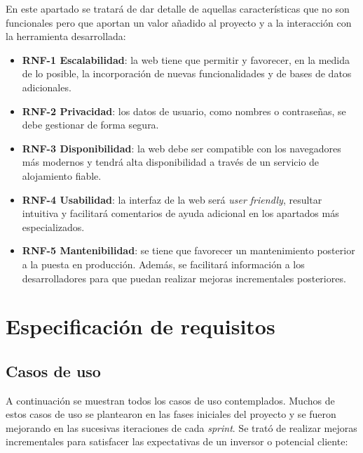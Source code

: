 En este apartado se tratará de dar detalle de aquellas características que no son funcionales pero que aportan un valor añadido al proyecto y a la interacción con la herramienta desarrollada:

\begin{itemize}
\item
\textbf{RNF-1 Escalabilidad}: la web tiene que permitir y favorecer, en la medida de lo posible, la incorporación de nuevas funcionalidades y de bases de datos adicionales. 

\item
\textbf{RNF-2 Privacidad}: los datos de usuario, como nombres o contraseñas, se debe gestionar de forma segura. 

\item
\textbf{RNF-3 Disponibilidad}: la web debe ser compatible con los navegadores más modernos y tendrá alta disponibilidad a través de un servicio de alojamiento fiable. 

\item
\textbf{RNF-4 Usabilidad}: la interfaz de la web será \emph{user friendly}, resultar intuitiva y facilitará comentarios de ayuda adicional en los apartados más especializados. 

\item
\textbf{RNF-5 Mantenibilidad}: se tiene que favorecer un mantenimiento posterior a la puesta en producción. Además, se facilitará información a los desarrolladores para que puedan realizar mejoras incrementales posteriores. 
\end{itemize}


\section{Especificación de requisitos}

\subsection{Casos de uso}\label{casos_uso}

A continuación se muestran todos los casos de uso contemplados. Muchos de estos casos de uso se plantearon en las fases iniciales del proyecto y se fueron mejorando en las sucesivas iteraciones de cada \emph{sprint}. Se trató de realizar mejoras incrementales para satisfacer las expectativas de un inversor o potencial cliente:



